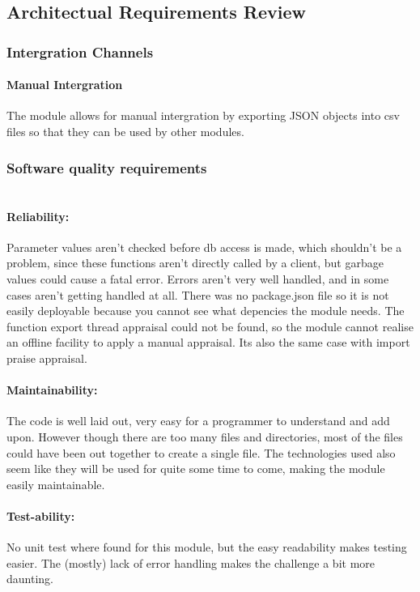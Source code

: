 \subsection{Architectual Requirements Review}

\subsubsection{Intergration Channels}
\paragraph {Manual Intergration}
The module allows for manual intergration by exporting JSON objects into csv files so that they can be used by other modules.
\par

\subsubsection{Software quality requirements} 

\paragraph{\\Reliability:}
Parameter values aren't checked before db access is made, which shouldn't be a problem, since these functions aren't directly called by a client, but garbage values could cause a fatal error. Errors aren't very well handled, and in some cases aren't getting handled at all. There was no package.json file so it is not easily deployable because you cannot see what depencies the module needs. The function export thread appraisal could not be found, so the module cannot realise an offline facility to apply a manual appraisal. Its also the same case with import praise appraisal. 
\par
\paragraph{Maintainability:}
The code is well laid out, very easy for a programmer to understand and add upon. However though there are too many files and directories, most of the files could have been out together to create a single file. The technologies used also seem like they will be used for quite some time to come, making the module easily maintainable.
\par
\paragraph{Test-ability:}
 No unit test where found for this module, but the easy readability makes testing easier. The (mostly) lack of error handling makes the challenge a bit more daunting.
\par
